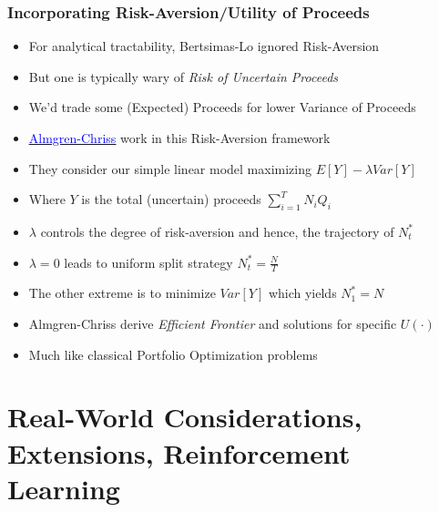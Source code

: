 \documentclass[handout]{beamer}
\begin{document}
\begin{frame}
\frametitle{Incorporating Risk-Aversion/Utility of Proceeds}
\pause
\begin{itemize}[<+->]
\item For analytical tractability, Bertsimas-Lo ignored Risk-Aversion
\item But one is typically wary of {\em Risk of Uncertain Proceeds}
\item We'd trade some (Expected) Proceeds for lower Variance of Proceeds
\item \href{https://www.math.nyu.edu/faculty/chriss/optliq_f.pdf}{\underline{\textcolor{blue}{Almgren-Chriss}}} work in this Risk-Aversion framework
\item They consider our simple linear model maximizing $E[Y] - \lambda Var[Y]$
\item Where $Y$ is the total (uncertain) proceeds $\sum_{i=1}^T N_i Q_i$
\item $\lambda$ controls the degree of risk-aversion and hence, the trajectory of $N_t^*$
\item $\lambda = 0$ leads to uniform split strategy $N_t^* = \frac N T$
\item The other extreme is to minimize $Var[Y]$ which yields $N_1^* = N$
\item Almgren-Chriss derive {\em Efficient Frontier} and solutions for specific $U(\cdot)$
\item Much like classical Portfolio Optimization problems
\end{itemize}
\end{frame}

\section{Real-World Considerations, Extensions, Reinforcement Learning}
\end{document}
